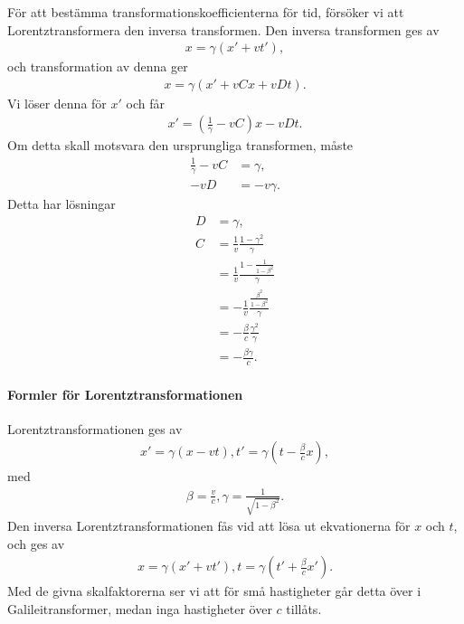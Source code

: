 För att bestämma transformationskoefficienterna för tid, försöker vi att Lorentztransformera den inversa transformen. Den inversa transformen ges av
\begin{align*}
	x = \gamma(x' + vt'),
\end{align*}
och transformation av denna ger
\begin{align*}
	x = \gamma(x' + vCx + vDt).
\end{align*}
Vi löser denna för $x'$ och får
\begin{align*}
	x' = \left(\frac{1}{\gamma} - vC\right)x - vDt.
\end{align*}
Om detta skall motsvara den ursprungliga transformen, måste
\begin{align*}
	\frac{1}{\gamma} - vC &= \gamma, \\
	-vD                   &= -v\gamma.
\end{align*}
Detta har lösningar
\begin{align*}
	D &= \gamma, \\
	C &= \frac{1}{v}\frac{1 - \gamma^{2}}{\gamma} \\
	  &= \frac{1}{v}\frac{1 - \frac{1}{1 - \beta^{2}}}{\gamma} \\
	  &= -\frac{1}{v}\frac{\frac{\beta^{2}}{1 - \beta^{2}}}{\gamma} \\
	  &= -\frac{\beta}{c}\frac{\gamma^{2}}{\gamma} \\
	  &= -\frac{\beta\gamma}{c}.
\end{align*}

\paragraph{Formler för Lorentztransformationen}
Lorentztransformationen ges av
\begin{align*}
	x' = \gamma(x - vt), t' = \gamma\left(t - \frac{\beta}{c}x\right),
\end{align*}
med
\begin{align*}
	\beta = \frac{v}{c}, \gamma = \frac{1}{\sqrt{1 - \beta^{2}}}.
\end{align*}
Den inversa Lorentztransformationen fås vid att lösa ut ekvationerna för $x$ och $t$, och ges av
\begin{align*}
	x = \gamma(x' + vt'), t = \gamma\left(t' + \frac{\beta}{c}x'\right).
\end{align*}
Med de givna skalfaktorerna ser vi att för små hastigheter går detta över i Galileitransformer, medan inga hastigheter över $c$ tillåts.

